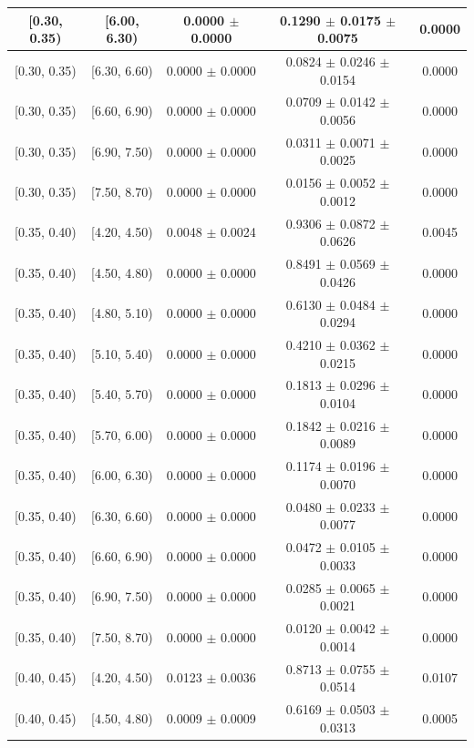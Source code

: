 \begin{longtable}{|c|c|c|c|c|}
\hline
[0.30, 0.35) & [6.00, 6.30) & 0.0000 $\pm$ 0.0000 & 0.1290 $\pm$ 0.0175 $\pm$ 0.0075 & 0.0000 \\ 
\hline
[0.30, 0.35) & [6.30, 6.60) & 0.0000 $\pm$ 0.0000 & 0.0824 $\pm$ 0.0246 $\pm$ 0.0154 & 0.0000 \\ 
\hline
[0.30, 0.35) & [6.60, 6.90) & 0.0000 $\pm$ 0.0000 & 0.0709 $\pm$ 0.0142 $\pm$ 0.0056 & 0.0000 \\ 
\hline
[0.30, 0.35) & [6.90, 7.50) & 0.0000 $\pm$ 0.0000 & 0.0311 $\pm$ 0.0071 $\pm$ 0.0025 & 0.0000 \\ 
\hline
[0.30, 0.35) & [7.50, 8.70) & 0.0000 $\pm$ 0.0000 & 0.0156 $\pm$ 0.0052 $\pm$ 0.0012 & 0.0000 \\ 
\hline
[0.35, 0.40) & [4.20, 4.50) & 0.0048 $\pm$ 0.0024 & 0.9306 $\pm$ 0.0872 $\pm$ 0.0626 & 0.0045 \\ 
\hline
[0.35, 0.40) & [4.50, 4.80) & 0.0000 $\pm$ 0.0000 & 0.8491 $\pm$ 0.0569 $\pm$ 0.0426 & 0.0000 \\ 
\hline
[0.35, 0.40) & [4.80, 5.10) & 0.0000 $\pm$ 0.0000 & 0.6130 $\pm$ 0.0484 $\pm$ 0.0294 & 0.0000 \\ 
\hline
[0.35, 0.40) & [5.10, 5.40) & 0.0000 $\pm$ 0.0000 & 0.4210 $\pm$ 0.0362 $\pm$ 0.0215 & 0.0000 \\ 
\hline
[0.35, 0.40) & [5.40, 5.70) & 0.0000 $\pm$ 0.0000 & 0.1813 $\pm$ 0.0296 $\pm$ 0.0104 & 0.0000 \\ 
\hline
[0.35, 0.40) & [5.70, 6.00) & 0.0000 $\pm$ 0.0000 & 0.1842 $\pm$ 0.0216 $\pm$ 0.0089 & 0.0000 \\ 
\hline
[0.35, 0.40) & [6.00, 6.30) & 0.0000 $\pm$ 0.0000 & 0.1174 $\pm$ 0.0196 $\pm$ 0.0070 & 0.0000 \\ 
\hline
[0.35, 0.40) & [6.30, 6.60) & 0.0000 $\pm$ 0.0000 & 0.0480 $\pm$ 0.0233 $\pm$ 0.0077 & 0.0000 \\ 
\hline
[0.35, 0.40) & [6.60, 6.90) & 0.0000 $\pm$ 0.0000 & 0.0472 $\pm$ 0.0105 $\pm$ 0.0033 & 0.0000 \\ 
\hline
[0.35, 0.40) & [6.90, 7.50) & 0.0000 $\pm$ 0.0000 & 0.0285 $\pm$ 0.0065 $\pm$ 0.0021 & 0.0000 \\ 
\hline
[0.35, 0.40) & [7.50, 8.70) & 0.0000 $\pm$ 0.0000 & 0.0120 $\pm$ 0.0042 $\pm$ 0.0014 & 0.0000 \\ 
\hline
[0.40, 0.45) & [4.20, 4.50) & 0.0123 $\pm$ 0.0036 & 0.8713 $\pm$ 0.0755 $\pm$ 0.0514 & 0.0107 \\ 
\hline
[0.40, 0.45) & [4.50, 4.80) & 0.0009 $\pm$ 0.0009 & 0.6169 $\pm$ 0.0503 $\pm$ 0.0313 & 0.0005 \\ 

\end{longtable}
